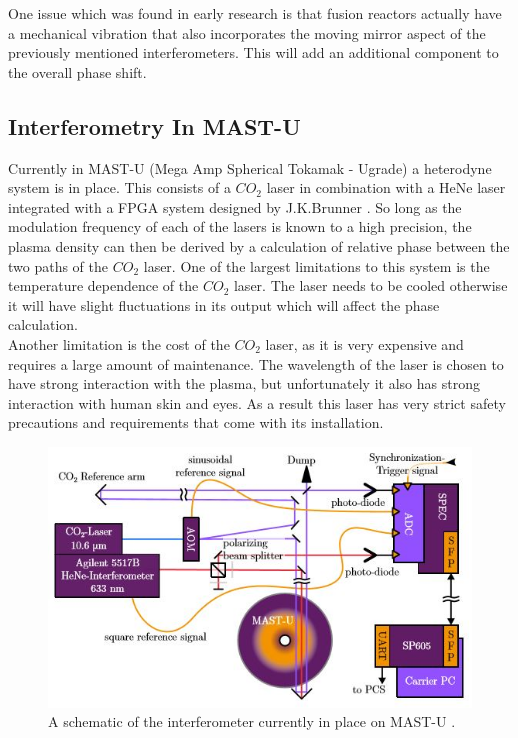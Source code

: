\documentclass[12pt,a4paper,oneside]{report}
\begin{document}
One issue which was found in early research is that fusion reactors actually have a mechanical vibration that also incorporates the moving mirror aspect of the previously mentioned interferometers. This will add an additional component to the overall phase shift.

    \subsection{Interferometry In MAST-U}
Currently in MAST-U (Mega Amp Spherical Tokamak - Ugrade) a heterodyne system is in place. This consists of a $CO_{2}$ laser in combination with a HeNe laser integrated with a FPGA system designed by J.K.Brunner \cite{Brunner2017}. So long as the modulation frequency of each of the lasers is known to a high precision, the plasma density can then be derived by a calculation of relative phase between the two paths of the $CO_{2}$ laser. One of the largest limitations to this system is the temperature dependence of the $CO_{2}$ laser. The laser needs to be cooled otherwise it will have slight fluctuations in its output which will affect the phase calculation.\\
Another limitation is the cost of the $CO_{2}$ laser, as it is very expensive and requires a large amount of maintenance. The wavelength of the laser is chosen to have strong interaction with the plasma, but unfortunately it also has strong interaction with human skin and eyes. As a result this laser has very strict safety precautions and requirements that come with its installation.    

\begin{figure}[H]
\includegraphics[width=\textwidth, center,angle=0]{Images/mastuint.JPG}
\caption{A schematic of the interferometer currently in place on MAST-U \cite{Brunner2017}.}
\label{MAST-UInt}
\end{figure}
\end{document}
